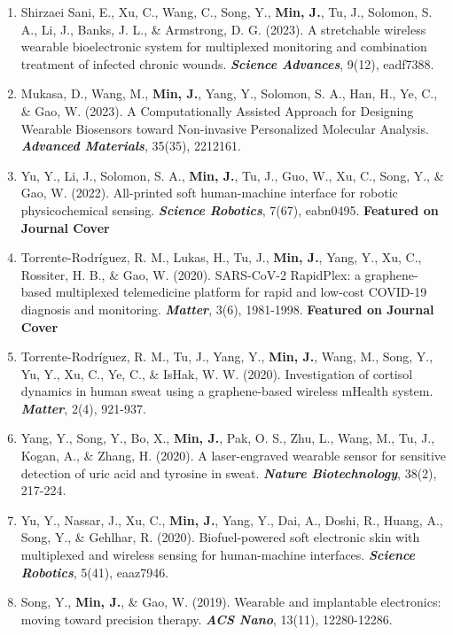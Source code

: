 \documentclass[11pt,a4paper]{article}
\begin{document}
\begin{enumerate}[leftmargin=*, itemsep=2pt, parsep=0pt, topsep=2pt]
  \item Shirzaei Sani, E., Xu, C., Wang, C., Song, Y., \textbf{Min, J.}, Tu, J., Solomon, S. A., Li, J., Banks, J. L., \& Armstrong, D. G. (2023). A stretchable wireless wearable bioelectronic system for multiplexed monitoring and combination treatment of infected chronic wounds. \textbf{\textit{Science Advances}}, 9(12), eadf7388.
  \item Mukasa, D., Wang, M., \textbf{Min, J.}, Yang, Y., Solomon, S. A., Han, H., Ye, C., \& Gao, W. (2023). A Computationally Assisted Approach for Designing Wearable Biosensors toward Non-invasive Personalized Molecular Analysis. \textbf{\textit{Advanced Materials}}, 35(35), 2212161.
  \item Yu, Y., Li, J., Solomon, S. A., \textbf{Min, J.}, Tu, J., Guo, W., Xu, C., Song, Y., \& Gao, W. (2022). All-printed soft human-machine interface for robotic physicochemical sensing. \textbf{\textit{Science Robotics}}, 7(67), eabn0495. \textbf{Featured on Journal Cover}
  \item Torrente-Rodríguez, R. M., Lukas, H., Tu, J., \textbf{Min, J.}, Yang, Y., Xu, C., Rossiter, H. B., \& Gao, W. (2020). SARS-CoV-2 RapidPlex: a graphene-based multiplexed telemedicine platform for rapid and low-cost COVID-19 diagnosis and monitoring. \textbf{\textit{Matter}}, 3(6), 1981-1998. \textbf{Featured on Journal Cover}
  \item Torrente-Rodríguez, R. M., Tu, J., Yang, Y., \textbf{Min, J.}, Wang, M., Song, Y., Yu, Y., Xu, C., Ye, C., \& IsHak, W. W. (2020). Investigation of cortisol dynamics in human sweat using a graphene-based wireless mHealth system. \textbf{\textit{Matter}}, 2(4), 921-937.
  \item Yang, Y., Song, Y., Bo, X., \textbf{Min, J.}, Pak, O. S., Zhu, L., Wang, M., Tu, J., Kogan, A., \& Zhang, H. (2020). A laser-engraved wearable sensor for sensitive detection of uric acid and tyrosine in sweat. \textbf{\textit{Nature Biotechnology}}, 38(2), 217-224.
  \item Yu, Y., Nassar, J., Xu, C., \textbf{Min, J.}, Yang, Y., Dai, A., Doshi, R., Huang, A., Song, Y., \& Gehlhar, R. (2020). Biofuel-powered soft electronic skin with multiplexed and wireless sensing for human-machine interfaces. \textbf{\textit{Science Robotics}}, 5(41), eaaz7946.
  \item Song, Y., \textbf{Min, J.}, \& Gao, W. (2019). Wearable and implantable electronics: moving toward precision therapy. \textbf{\textit{ACS Nano}}, 13(11), 12280-12286.
\end{enumerate}
\end{document}
